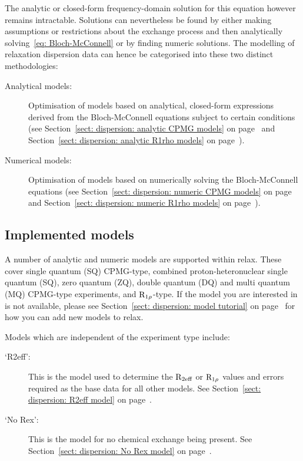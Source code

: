 The analytic or closed-form frequency-domain solution for this equation however remains intractable.
Solutions can nevertheless be found by either making assumptions or restrictions about the exchange process and then analytically solving~\ref{eq: Bloch-McConnell} or by finding numeric solutions.
The modelling of relaxation dispersion data can hence be categorised into these two distinct methodologies:
\begin{description}
  \item[Analytical models:]  Optimisation of models based on analytical, closed-form expressions derived from the Bloch-McConnell equations subject to certain conditions (see Section~\ref{sect: dispersion: analytic CPMG models} on page~\pageref{sect: dispersion: analytic CPMG models} and Section~\ref{sect: dispersion: analytic R1rho models} on page~\pageref{sect: dispersion: analytic R1rho models}).
  \item[Numerical models:]  Optimisation of models based on numerically solving the Bloch-McConnell equations (see Section~\ref{sect: dispersion: numeric CPMG models} on page~\pageref{sect: dispersion: numeric CPMG models} and Section~\ref{sect: dispersion: numeric R1rho models} on page~\pageref{sect: dispersion: numeric R1rho models}).
\end{description}




\subsection{Implemented models}
\label{sect: dispersion: implemented models}

A number of analytic and numeric models are supported within relax.
These cover single quantum (SQ) CPMG-type, combined proton-heteronuclear single quantum (SQ), zero quantum (ZQ), double quantum (DQ) and multi quantum (MQ) CPMG-type experiments, and $\mathrm{R}_{1\rho}$-type.
If the model you are interested in is not available, please see Section~\ref{sect: dispersion: model tutorial} on page~\pageref{sect: dispersion: model tutorial} for how you can add new models to relax.

Models which are independent of the experiment type include:
\begin{description}
  \item[`R2eff':]  This is the model used to determine the $\mathrm{R}_{\textrm{2eff}}$ or $\mathrm{R}_{1\rho}$ values and errors required as the base data for all other models.
    See Section~\ref{sect: dispersion: R2eff model} on page~\pageref{sect: dispersion: R2eff model}.
  \item[`No Rex':]  This is the model for no chemical exchange being present.
    See Section~\ref{sect: dispersion: No Rex model} on page~\pageref{sect: dispersion: No Rex model}.
\end{description}


